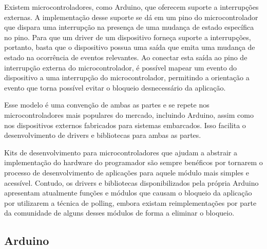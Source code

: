 \documentclass{article}
\begin{document}
\par Existem microcontroladores, como Arduino, que oferecem suporte a interrupções externas. A implementação desse suporte se dá em um pino do microcontrolador que dispara uma interrupção na presença de uma mudança de estado específica no pino. Para que um driver de um dispositivo forneça suporte a interrupções, portanto, basta que o dispositivo possua uma saída que emita uma mudança de estado na ocorrência de eventos relevantes. Ao conectar esta saída ao pino de interrupção externa do microcontrolador, é possível mapear um evento do dispositivo a uma interrupção do microcontrolador, permitindo a orientação a evento que torna possível evitar o bloqueio desnecessário da aplicação.
\par Esse modelo é uma convenção de ambas as partes e se repete nos microcontroladores mais populares do mercado, incluindo Arduino, assim como nos dispositivos externos fabricados para sistemas embarcados. Isso facilita o desenvolvimento de drivers e bibliotecas para ambas as partes.
\par Kits de desenvolvimento para microcontroladores que ajudam a abstrair a implementação do hardware do programador são sempre benéficos por tornarem o processo de desenvolvimento de aplicações para aquele módulo mais simples e acessível. Contudo, os drivers e bibliotecas disponibilizados pela própria Arduino apresentam atualmente funções e módulos que causam o bloqueio da aplicação por utilizarem a técnica de polling, embora existam reimplementações por parte da comunidade de alguns desses módulos de forma a eliminar o bloqueio.

\subsection{Arduino}
\end{document}
